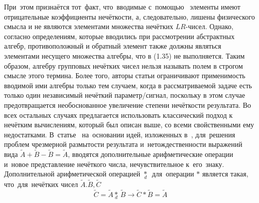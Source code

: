 При~этом признаётся тот~факт, что~вводимые с~помощью~  элементы имеют отрицательные коэффициенты нечёткости, а, следовательно, лишены физического смысла и не являются элементами множества нечётких $LR$-чисел. Однако, согласно определениям, которые вводились при рассмотрении абстрактных алгебр, противоположный и обратный элемент также должны являться элементами несущего множества алгебры, что в (1.35) не выполняется. Таким образом, алгебру групповых нечётких чисел нельзя называть полем в строгом смысле этого термина. Более того, авторы статьи ограничивают применимость вводимой ими алгебры только тем случаем, когда в рассматриваемой задаче есть только один независимый нечёткий параметр/сигнал, поскольку в этом случае предотвращается необоснованное увеличение степени нечёткости результата. Во всех остальных случаях предлагается использовать классический подход к нечётким вычислениям, который был описан выше, со всеми свойственными ему недостатками.
В~статье~\cite{Piter_SCM} на~основании идей, изложенных в~\cite{Borisov_Krumberg_Riga, Alexeev_Riga}, для~решения проблем чрезмерной размытости результата и~нетождественности выражений вида $\tilde A+\tilde B-\tilde B=\tilde A$, вводятся дополнительные арифметические операции и~новое представление нечёткого числа, нечувствительное к~его~знаку. Дополнительной арифметической операцией $\underset{d}{\mathop{*}}\,$ для~операции $*$ является такая, что~для~нечётких чисел $\tilde A. \tilde B, \tilde C$
\begin{equation}
\label{eq:complementary-operations}
	\tilde{C}=\tilde{A}\underset{d}{\mathop{*}}\,\tilde{B}\to \tilde{C}*\tilde{B}=\tilde{A}
\end{equation}

